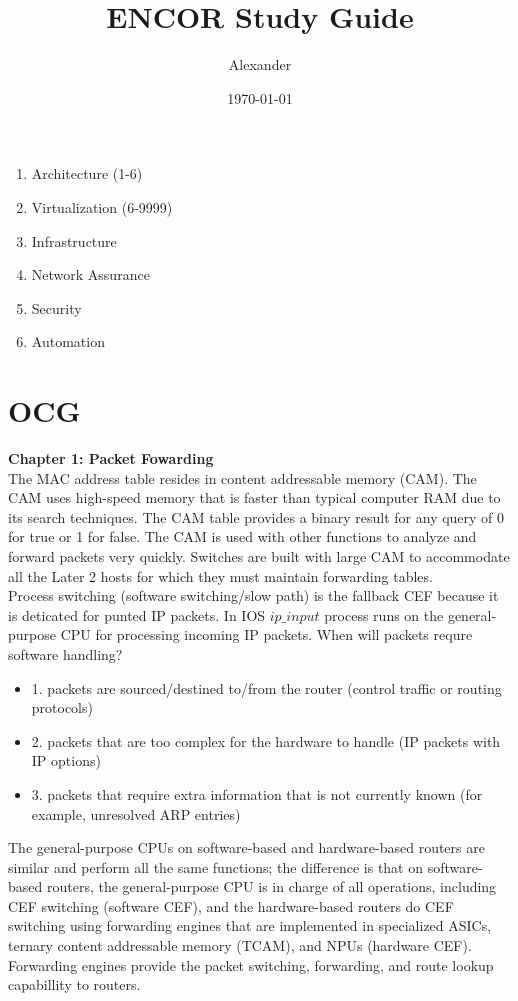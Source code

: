 \documentclass{article}
\title{ENCOR Study Guide}
\author{Alexander}
\date{\today}
\begin{document}
\maketitle

\begin{enumerate}
\item Architecture (1-6)
\item Virtualization (6-9999)
\item Infrastructure
\item Network Assurance
\item Security
\item Automation
\end{enumerate}

\section*{OCG}

\textbf{Chapter 1: Packet Fowarding}\\

	The MAC address table resides in content addressable memory (CAM). The CAM uses high-speed memory that is faster than typical computer RAM due to its search techniques. The CAM table provides a binary result for any query of 0 for true or 1 for false. The CAM is used with other functions to analyze and forward packets very quickly. Switches are built with large CAM to accommodate all the Later 2 hosts for which they must maintain forwarding tables.\\

	Process switching (software switching/slow path) is the fallback CEF because it is deticated for punted IP packets. In IOS $ip\_input$ process runs on the general-purpose CPU for processing incoming IP packets. When will packets requre software handling?

\begin{itemize}
\item 1. packets are sourced/destined to/from the router (control traffic or routing protocols) 
\item 2. packets that are too complex for the hardware to handle (IP packets with IP options) 
\item 3. packets that require extra information that is not currently known (for example, unresolved ARP entries)
\end{itemize}

	The general-purpose CPUs on software-based and hardware-based routers are similar and perform all the same functions; the difference is that on software-based routers, the general-purpose CPU is in charge of all operations, including CEF switching (software CEF), and the hardware-based routers do CEF switching using forwarding  engines that are implemented in specialized ASICs, ternary content addressable memory (TCAM), and NPUs (hardware CEF). Forwarding engines provide the packet switching, forwarding, and route lookup capabillity to routers.\\
\end{document}
